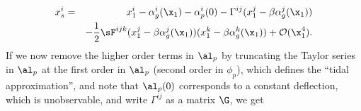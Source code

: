 \begin{eqnarray}
x^i_s &=& x^i_1 - \alpha^i_g(\x_1) - \alpha_p^i(0) - \Gamma^{ij} (x^j_1 - \beta \alpha^j_g(\x_1)) \nonumber \\
&&- \frac{1}{2} \sF^{ijk} (x^j_1 - \beta \alpha^j_g(\x_1)) (x^k_1 - \beta \alpha^k_g(\x_1)) + \mathcal{O}(\x_1^4) .
\end{eqnarray}
\normalsize
If we now remove the higher order terms in $\al_p$ by truncating the Taylor series in $\al_p$ at the first order in $\al_p$ (second order in $\phi_p$), which defines the ``tidal approximation'', and note that $\al_p(0)$ corresponds to a constant deflection, which is unobservable, and write $\Gamma^{ij}$ as a matrix $\G$, we get
  
  